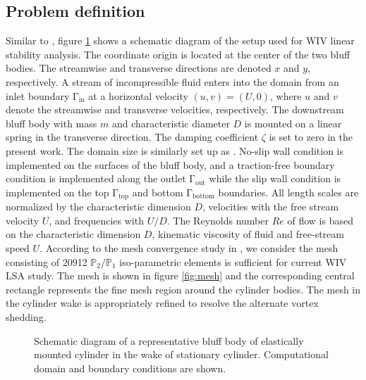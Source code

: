 \subsection{Problem definition}\label{sec:prob}
Similar to \cite{yao_jfm_1}, figure \ref{fig:schematic} shows a schematic diagram of the setup used for WIV linear stability analysis. 
The coordinate origin is located at the center of the two bluff bodies.
The streamwise and transverse directions are denoted $x$ and $y$, respectively.
%
A stream of incompressible fluid enters into the domain from an 
inlet boundary $\mathrm{\Gamma_{in}}$ at a horizontal velocity $(u,v)=(U,0)$, where $u$ and $v$ 
denote the streamwise and transverse velocities, respectively. 
The downstream bluff body with mass $m$ and characteristic diameter $D$ is mounted on a linear spring 
in the transverse direction. The damping coefficient $\zeta$ is set to zero in the present work.
%
The domain size is similarly set up as \cite{yao_jfm_1}. 
No-slip wall condition is implemented on the surfaces of the bluff body, and a traction-free
boundary condition is implemented along the outlet $\mathrm{\Gamma_{out}}$
while the slip wall condition is implemented on the top $\mathrm{\Gamma_{top}}$
and bottom $\mathrm{\Gamma_{bottom}}$ boundaries. 
%
All length scales are normalized by 
the characteristic dimension $D$, velocities
with the free stream velocity $U$, and frequencies with $U/D$.
%
The Reynolds number $Re$ of flow is based on the
characteristic dimension $D$, kinematic viscosity of fluid 
and free-stream speed $U$.
%
According to the mesh convergence study in \cite{yao_jfm_1}, we consider 
the mesh consisting of 20912 $\mathbb{P}_{2}/\mathbb{P}_{1}$ 
iso-parametric elements is sufficient for current WIV LSA study. 
%
The mesh is shown in figure \ref{fig:mesh} and 
the corresponding central rectangle represents the fine mesh region around the cylinder bodies. 
The mesh in the cylinder wake is appropriately refined to resolve 
the alternate vortex shedding. 
\begin{figure}
	 \centering
     \caption{Schematic diagram of a representative bluff body of 
     elastically mounted cylinder in the wake of stationary cylinder. 
     Computational domain and boundary conditions are shown.}
\label{fig:schematic}
\end{figure}

